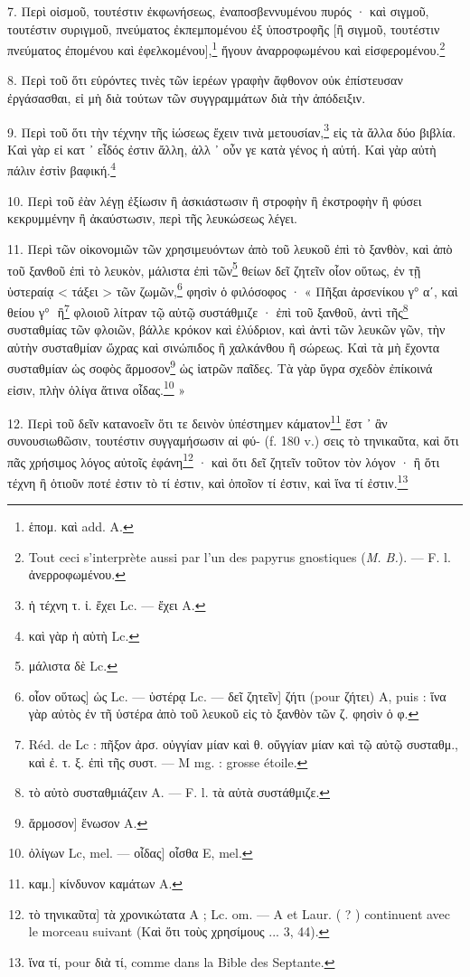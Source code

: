 \documentclass[a4paper, 11pt, oneside, polutonikogreek, french]{article}
\newcommand*\svgB{}
\begin{document}
7. Περὶ οἰσμοῦ, τουτέστιν ἐκφωνήσεως, ἐναποσβεννυμένου πυρός · καὶ σιγμοῦ, τουτέστιν συριγμοῦ, πνεύματος ἐκπεμπομένου ἐξ ὑποστροφῆς [ἢ σιγμοῦ, τουτέστιν πνεύματος ἐπομένου καὶ ἐφελκομένου],\footnote{ἑπομ. καὶ add. A.} ἤγουν ἀναρροφωμένου καὶ εἰσφερομένου.\footnote{Tout ceci s'interprète aussi par l'un des papyrus gnostiques (\emph{M. B.}). --- F. l. ἀνερροφωμένου.}

8. Περὶ τοῦ ὅτι εὑρόντες τινὲς τῶν ἱερέων γραφὴν ἄφθονον οὐκ ἐπίστευσαν ἐργάσασθαι, εἰ μὴ διὰ τούτων τῶν συγγραμμάτων διὰ τὴν ἀπόδειξιν.

9. Περὶ τοῦ ὅτι τὴν τέχνην τῆς ἰώσεως ἔχειν τινὰ μετουσίαν,\footnote{ἡ τέχνη τ. ἰ. ἔχει Lc. --- ἔχει A.} εἰς τὰ ἄλλα δύο βιβλία. Καὶ γὰρ εἰ κατ ᾽ εἶδός ἐστιν ἄλλη, ἀλλ ᾽ οὖν γε κατὰ γένος ἡ αὐτή. Καὶ γὰρ αὐτὴ πάλιν ἐστὶν βαφική.\footnote{καὶ γὰρ ἡ αὑτὴ Lc.}

10. Περὶ τοῦ ἐὰν λέγῃ ἐξίωσιν ἢ ἀσκιάστωσιν ἢ στροφὴν ἢ ἐκστροφὴν ἢ φύσει κεκρυμμένην ἢ ἀκαύστωσιν, περὶ τῆς λευκώσεως λέγει.

11. Περὶ τῶν οἰκονομιῶν τῶν χρησιμευόντων ἀπὸ τοῦ λευκοῦ ἐπὶ τὸ ξανθὸν, καὶ ἀπὸ τοῦ ξανθοῦ ἐπὶ τὸ λευκὸν, μάλιστα ἐπὶ τῶν\footnote{μάλιστα δὲ Lc.} θείων δεῖ ζητεῖν οἷον οὕτως, ἐν τῇ ὑστεραίᾳ < τάξει > τῶν ζωμῶν,\footnote{οἶον οὕτως] ὡς Lc. --- ὑστέρᾳ Lc. --- δεῖ ζητεῖν] ζήτι (pour ζήτει) A, puis : ἵνα γὰρ αὐτὸς ἐν τῆ ὑστέρα ἀπὸ τοῦ λευκοῦ εἰς τὸ ξανθὸν τῶν ζ. φησὶν ὁ φ.} φησὶν ὁ φιλόσοφος · « Πῆξαι ἀρσενίκου γ° αʹ, καὶ θείου γ° $\svgB$ ἢ\footnote{Réd. de Lc : πῆξον ἀρσ. οὐγγίαν μίαν καὶ θ. οὔγγίαν μίαν καὶ τῷ αὐτῷ συσταθμ., καὶ ἐ. τ. ξ. ἐπὶ τῆς συστ. --- M mg. : grosse étoile.} φλοιοῦ λίτραν τῷ αὐτῷ συστάθμιζε · ἐπὶ τοῦ ξανθοῦ, ἀντὶ τῆς\footnote{τὸ αὐτὸ συσταθμιάζειν A. --- F. l. τὰ αὐτὰ συστάθμιζε.} συσταθμίας τῶν φλοιῶν, βάλλε κρόκον καὶ ἐλύδριον, καὶ ἀντὶ τῶν λευκῶν γῶν, τὴν αὐτὴν συσταθμίαν ὤχρας καὶ σινώπιδος ἢ χαλκάνθου ἢ σώρεως. Καὶ τὰ μὴ ἔχοντα συσταθμίαν ὡς σοφὸς ἅρμοσον\footnote{ἅρμοσον] ἕνωσον A.} ὡς ἰατρῶν παῖδες. Τὰ γὰρ ὕγρα σχεδὸν ἐπίκοινά εἰσιν, πλὴν ὀλίγα ἅτινα οἶδας.\footnote{ὀλίγων Lc, mel. --- οἶδας] οἶσθα E, mel.} »

12. Περὶ τοῦ δεῖν κατανοεῖν ὅτι τε δεινὸν ὑπέστημεν κάματον\footnote{καμ.] κίνδυνον καμάτων A.} ἔστ ᾽ ἂν συνουσιωθῶσιν, τουτέστιν συγγαμήσωσιν αἱ φύ- (f. 180 v.) σεις τὸ τηνικαῦτα, καὶ ὅτι πᾶς χρήσιμος λόγος αὐτοῖς ἐφάνη\footnote{τὸ τηνικαῦτα] τὰ χρονικώτατα A ; Lc. om. --- A et Laur. ( ? ) continuent avec le morceau suivant (Καὶ ὅτι τοὺς χρησίμους ... 3, 44).} · καὶ ὅτι δεῖ ζητεῖν τοῦτον τὸν λόγον · ἢ ὅτι τέχνη ἢ ὁτιοῦν ποτέ ἐστιν τὸ τί ἐστιν, καὶ ὁποῖον τί ἐστιν, καὶ ἵνα τί ἐστιν.\footnote{ἵνα τί, pour διὰ τί, comme dans la Bible des Septante.}
\end{document}
